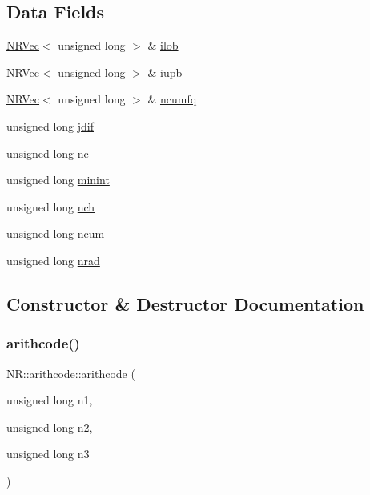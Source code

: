 \subsection*{Data Fields}
\begin{DoxyCompactItemize}
\item 
\mbox{\hyperlink{classNR_1_1NRVec}{N\+R\+Vec}}$<$ unsigned long $>$ \& \mbox{\hyperlink{classNR_1_1arithcode_a2f0f4815da12b7e05ffdda2c6c2cd22b}{ilob}}
\item 
\mbox{\hyperlink{classNR_1_1NRVec}{N\+R\+Vec}}$<$ unsigned long $>$ \& \mbox{\hyperlink{classNR_1_1arithcode_ac8290637848848253e8f83959759620d}{iupb}}
\item 
\mbox{\hyperlink{classNR_1_1NRVec}{N\+R\+Vec}}$<$ unsigned long $>$ \& \mbox{\hyperlink{classNR_1_1arithcode_ab42f8b311dc85df156a07c70ce179a59}{ncumfq}}
\item 
unsigned long \mbox{\hyperlink{classNR_1_1arithcode_ae8879f54067355c1e3fe8902d23834e1}{jdif}}
\item 
unsigned long \mbox{\hyperlink{classNR_1_1arithcode_a40165e7b7f7eeaed40619fa7d246f0a2}{nc}}
\item 
unsigned long \mbox{\hyperlink{classNR_1_1arithcode_a63e003cc67bbdbbdff8c880b7e2d0471}{minint}}
\item 
unsigned long \mbox{\hyperlink{classNR_1_1arithcode_adff76993d50ef77b4aa6f937dac31fb9}{nch}}
\item 
unsigned long \mbox{\hyperlink{classNR_1_1arithcode_a942d481da12f999dd8a6a6cdf701eb13}{ncum}}
\item 
unsigned long \mbox{\hyperlink{classNR_1_1arithcode_a5f878b2a52dbcbd16e23593f6510959c}{nrad}}
\end{DoxyCompactItemize}


\subsection{Constructor \& Destructor Documentation}
\mbox{\label{classNR_1_1arithcode_a796f8507b3d8ca8262843905ea6712ec}} 
\subsubsection{\texorpdfstring{arithcode()}{arithcode()}\hspace{0.1cm}{\footnotesize\ttfamily [1/3]}}
{\footnotesize\ttfamily N\+R\+::arithcode\+::arithcode (\begin{DoxyParamCaption}\item[{unsigned long}]{n1,  }\item[{unsigned long}]{n2,  }\item[{unsigned long}]{n3 }\end{DoxyParamCaption})\hspace{0.3cm}{\ttfamily [inline]}}

